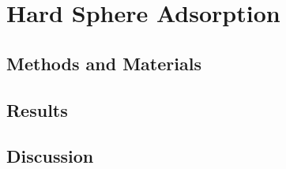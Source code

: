 
\chapter{Hard Sphere Adsorption}


\section*{Methods and Materials}


\section*{Results}


\section*{Discussion}
